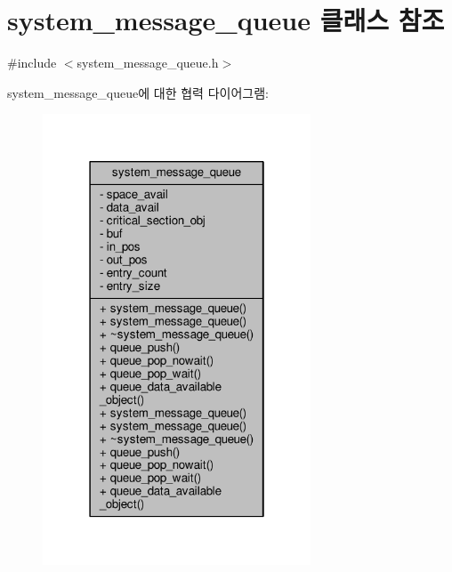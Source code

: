 \hypertarget{classsystem__message__queue}{}\section{system\+\_\+message\+\_\+queue 클래스 참조}
\label{classsystem__message__queue}


{\ttfamily \#include $<$system\+\_\+message\+\_\+queue.\+h$>$}



system\+\_\+message\+\_\+queue에 대한 협력 다이어그램\+:
\nopagebreak
\begin{figure}[H]
\begin{center}
\leavevmode
\includegraphics[width=226pt]{classsystem__message__queue__coll__graph}
\end{center}
\end{figure}
